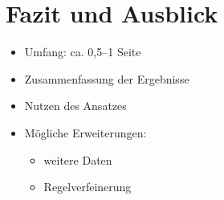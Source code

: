 \section{Fazit und Ausblick}
\begin{itemize}
    \item Umfang: ca. 0,5--1 Seite
    \item Zusammenfassung der Ergebnisse
    \item Nutzen des Ansatzes
    \item Mögliche Erweiterungen:
    \begin{itemize}
        \item weitere Daten
        \item Regelverfeinerung
    \end{itemize}
\end{itemize}